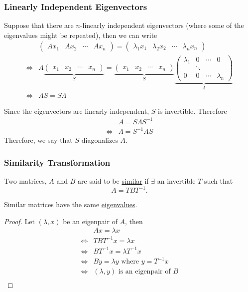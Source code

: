 \documentclass{beamer}
\begin{document}
\begin{frame}\frametitle{Linearly Independent Eigenvectors}
	Suppose that there are $n$-linearly independent eigenvectors (where some of the eigenvalues might be repeated), then we can write
	\begin{align*}
		&
		\begin{pmatrix} 
			Ax_1 & Ax_2 & \cdots & Ax_n
		\end{pmatrix}
		= \begin{pmatrix}
 			\lambda_1x_1 & \lambda_2x_2 & \cdots & \lambda_nx_n
 		  \end{pmatrix}	 \\
 		\iff &
		A 
		\underbrace{
			\begin{pmatrix} 
				x_1 & x_2 & \cdots & x_n
		  	\end{pmatrix}
		}_S
		= \underbrace{
			\begin{pmatrix} 
				x_1 & x_2 & \cdots & x_n
		  	\end{pmatrix}
		  }_S
		  \underbrace{
		  	\begin{pmatrix}
	    		\lambda_1 & 0 & \cdots & 0 \\
	    		& \ddots \\
	    		0 & 0 & \cdots & \lambda_n
	  	  	\end{pmatrix}
	  	  }_{\Lambda} \\
	  	\iff &
	  	AS = S\Lambda
	\end{align*}
	
	Since the eigenvectors are linearly independent, $S$ is invertible.  Therefore
	\begin{align*}
		& A = S\Lambda S^{-1}  \\
		\iff & \Lambda = S^{-1}AS 
	\end{align*}
	Therefore, we say that $S$ diagonalizes $A$.
\end{frame}

\begin{frame}\frametitle{Similarity Transformation}
	\begin{definition}
		Two matrices, $A$ and $B$ are said to be \underline{similar} if
		$\exists $ an invertible $T$ such that 
		\[ 
			A = TBT^{-1}.
		\]		
	\end{definition}

	\begin{lemma}
		Similar matrices have the same \underline{eigenvalues}.	
	\end{lemma}
	\begin{proof}
		Let $(\lambda,x)$ be an eigenpair of $A$, then
		\begin{align*}
			& Ax = \lambda x\\
			\iff & TBT^{-1}x = \lambda x\\
			\iff & BT^{-1}x = \lambda T^{-1}x\\
			\iff & By = \lambda y \text{ where } y = T^{-1}x\\
			\iff & (\lambda,y) \text{ is an eigenpair of }B\\
		\end{align*}		
	\end{proof}
	\end{frame}
\end{document}
